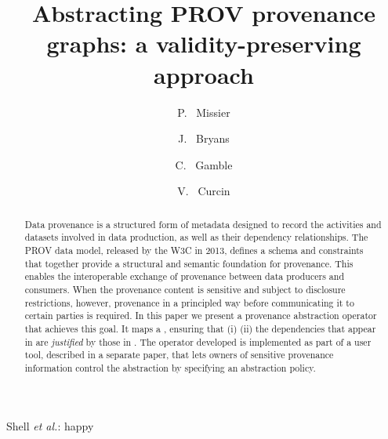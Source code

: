 \documentclass{elsarticle}
\begin{document}
\title{Abstracting PROV provenance graphs: a validity-preserving approach}

 
\author[ncl]{P. ~Missier }

\author[cov]{J. ~Bryans}

\author[ncl]{C. ~Gamble}
    
\author[kcl]{V. ~Curcin}

\address[ncl]{School of Computing, Newcastle University, UK}
\address[cov]{Institute for Future Transport and Cities, Coventry University, UK}
\address[kcl]{Kings College, London, UK}



%
{Shell \MakeLowercase{\textit{et al.}}: happy}


\begin{abstract}
  Data provenance is a structured form of metadata designed to record the activities and datasets involved in data production, as well as their dependency relationships. The PROV data model, released by the W3C in 2013, defines a schema and constraints that together provide a structural and semantic foundation for provenance. This enables the interoperable exchange of provenance between data producers and consumers. When the provenance content is sensitive and subject to disclosure restrictions, however,  provenance in a principled way before communicating it to certain parties is required. In this paper we present a provenance abstraction operator that achieves this goal. It maps a , ensuring that (i)   (ii) the dependencies that appear in  are \textit{justified} by those  in .    The operator developed is implemented as part of a user tool, described in a separate paper, that lets owners of sensitive provenance information control the abstraction by specifying an abstraction policy.
\end{abstract}
\end{document}
